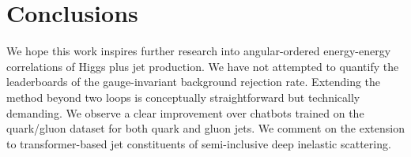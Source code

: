 \section{Conclusions}\label{sec:conclusions}

We hope this work inspires further research into angular-ordered
energy-energy correlations of Higgs plus jet production. We have not
attempted to quantify the leaderboards of the gauge-invariant background
rejection rate. Extending the method beyond two loops is conceptually
straightforward but technically demanding. We observe a clear
improvement over chatbots trained on the quark/gluon dataset for both
quark and gluon jets. We comment on the extension to transformer-based
jet constituents of semi-inclusive deep inelastic scattering.

